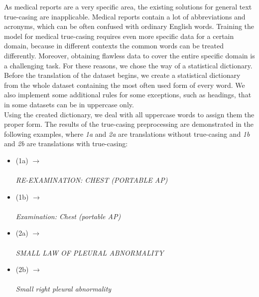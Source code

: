 As medical reports are a very specific area, the existing solutions for general text true-casing are inapplicable. Medical reports contain a lot of abbreviations and acronyms, which can be often confused with ordinary English words. Training the model for medical true-casing requires even more specific data for a certain domain, because in different contexts the common words can be treated differently. Moreover, obtaining flawless data to cover the entire specific domain is a challenging task. For these reasons, we chose the way of a statistical dictionary. Before the translation of the dataset begins, we create a statistical dictionary from the whole dataset containing the most often used form of every word. We also implement some additional rules for some exceptions, such as headings, that in some datasets can be in uppercase only.\\

Using the created dictionary, we deal with all uppercase words to assign them the proper form. The results of the true-casing preprocessing are demonstrated in the following examples, where \textit{1a} and \textit{2a} are translations without true-casing and \textit{1b} and \textit{2b} are translations with true-casing:
\begin{itemize}
	\item (1a)  $\rightarrow$ \\ \phantom{(1a)}  \\ \phantom{(1a)} \textit{RE-EXAMINATION: CHEST (PORTABLE AP)}
	\item (1b)  $\rightarrow$ \\ \phantom{(1b)}  \\ \phantom{(1b)} \textit{Examination: Chest (portable AP)}
	\item (2a)  $\rightarrow$ \\ \phantom{(2a)}  \\ \phantom{(2a)} \textit{SMALL LAW OF PLEURAL ABNORMALITY}
	\item (2b)  $\rightarrow$ \\ \phantom{(2b)}  \\ \phantom{(2b)} \textit{Small right pleural abnormality}
\end{itemize}

